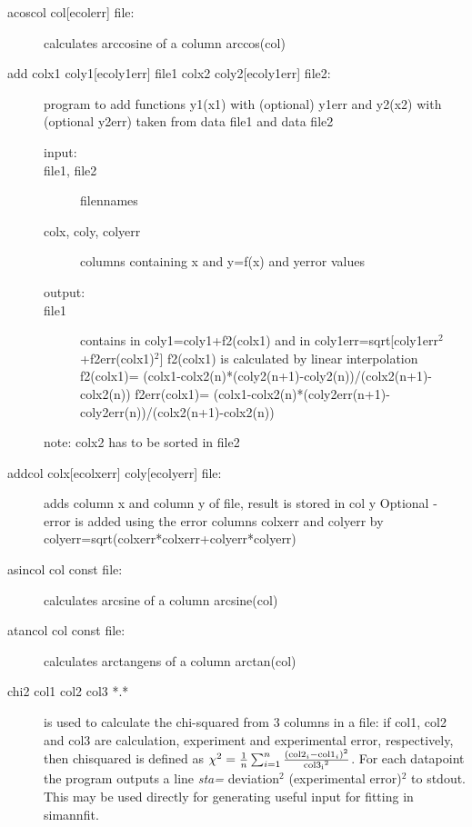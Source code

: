 \begin{description}
\item [\prg acoscol col{[ecolerr]} file:] calculates arccosine of a column arccos(col) 
\item [\prg add colx1 coly1{[ecoly1err]} file1 colx2 coly2{[ecoly1err]} file2:] 
   program to add functions y1(x1) with (optional) y1err and y2(x2) with (optional y2err)
       taken from data file1 and data file2

\begin{description}
 \item [input:]
 \item[ file1, file2]         filennames
 \item [colx, coly, colyerr]  columns containing x and y=f(x) and yerror values
\item[  output:]
\item[  file1]            contains in coly1=coly1+f2(colx1)
                   and in   coly1err=sqrt[coly1err$^2$+f2err(colx1)$^2$]
                   f2(colx1) is calculated by linear
                   interpolation
                   f2(colx1)=
                   (colx1-colx2(n)*(coly2(n+1)-coly2(n))/(colx2(n+1)-colx2(n))
                   f2err(colx1)=
                   (colx1-colx2(n)*(coly2err(n+1)-coly2err(n))/(colx2(n+1)-colx2(n))
\end{description}
  note:            colx2 has to be sorted in file2
\item [\prg addcol  colx{[ecolxerr]} coly{[ecolyerr]} file:] adds column x and column y of file, result is %
stored in col y
Optional - error is added using the error columns colxerr and colyerr
by colyerr=sqrt(colxerr*colxerr+colyerr*colyerr)
\item [\prg asincol col const file:] calculates arcsine of a column arcsine(col) 
\item [\prg atancol col const file:] calculates arctangens of a column %
arctan(col) 
\item [\prg chi2 col1 col2 col3 *.*] is used to calculate the 
 chi-squared from 3 columns in a file: if col1, col2 and col3 are calculation, 
 experiment and experimental error, respectively, then
  chisquared is defined as $\chi^2=\frac{1}{n}\sum_{i=1}^n \frac{({\rm col2}_i-{\rm %
col1}_i)^2}{{\rm col3_i}^2}$. For each datapoint the program outputs a line
{\em sta=} deviation$^2$  (experimental error)$^2$ to stdout. This may be 
used directly for generating useful input for fitting in {\prg simannfit}.

\end{description}
